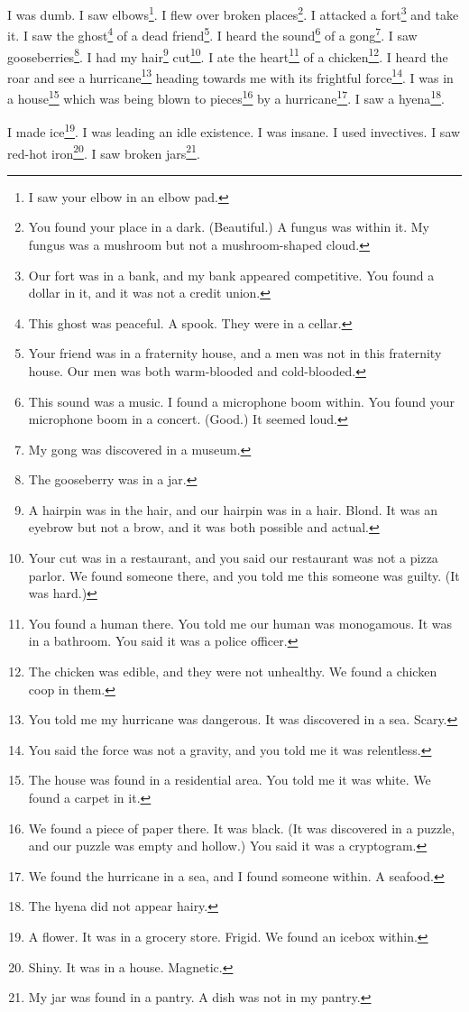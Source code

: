 \documentclass[12pt]{book}
\begin{document}
 I was dumb. I saw elbows\footnote{I saw your elbow in an elbow pad.}. I flew over broken places\footnote{You found your place in a dark. (Beautiful.) A fungus was within it. My fungus was a mushroom but not a mushroom-shaped cloud.}. I attacked a fort\footnote{Our fort was in a bank, and my bank appeared competitive. You found a dollar in it, and it was not a credit union.} and take it. I saw the ghost\footnote{This ghost was peaceful. A spook. They were in a cellar.} of a dead friend\footnote{Your friend was in a fraternity house, and a men was not in this fraternity house. Our men was both warm-blooded and cold-blooded.}. I heard the sound\footnote{This sound was a music. I found a microphone boom within. You found your microphone boom in a concert. (Good.) It seemed loud.} of a gong\footnote{My gong was discovered in a museum.}. I saw gooseberries\footnote{The gooseberry was in a jar.}. I had my hair\footnote{A hairpin was in the hair, and our hairpin was in a hair. Blond. It was an eyebrow but not a brow, and it was both possible and actual.} cut\footnote{Your cut was in a restaurant, and you said our restaurant was not a pizza parlor. We found someone there, and you told me this someone was guilty. (It was hard.)}. I ate the heart\footnote{You found a human there. You told me our human was monogamous. It was in a bathroom. You said it was a police officer.} of a chicken\footnote{The chicken was edible, and they were not unhealthy. We found a chicken coop in them.}. I heard the roar and see a hurricane\footnote{You told me my hurricane was dangerous. It was discovered in a sea. Scary.} heading towards me with its frightful force\footnote{You said the force was not a gravity, and you told me it was relentless.}. I was in a house\footnote{The house was found in a residential area. You told me it was white. We found a carpet in it.} which was being blown to pieces\footnote{We found a piece of paper there. It was black. (It was discovered in a puzzle, and our puzzle was empty and hollow.) You said it was a cryptogram.} by a hurricane\footnote{We found the hurricane in a sea, and I found someone within. A seafood.}. I saw a hyena\footnote{The hyena did not appear hairy.}. 

 I made ice\footnote{A flower. It was in a grocery store. Frigid. We found an icebox within.}. I was leading an idle existence. I was insane. I used invectives. I saw red-hot iron\footnote{Shiny. It was in a house. Magnetic.}. I saw broken jars\footnote{My jar was found in a pantry. A dish was not in my pantry.}. 
\end{document}
